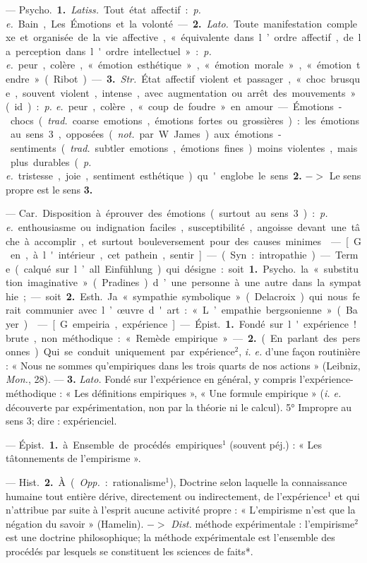 \begin{itemize}[leftmargin=1cm, label=, itemsep=1pt]
 — \si{Psycho.} {\bf 1.} {\it Latiss.} Tout
état affectif : {\it p. e.} Bain, Les Émotions
et la volonté. — {\bf 2.} {\it Lato.} Toute manifestation complexe et organisée
de la vie affective, « équivalente
dans l’ordre affectif, de la perception dans l'ordre intellectuel » :
{\it p. e.} peur, colère, « émotion esthétique », « émotion morale », « émotion tendre » (Ribot). — {\bf 3.} {\it Str.}
État affectif violent et passager,
« choc brusque, souvent violent,
intense, avec augmentation ou arrêt
des mouvements » (id.) : {\it p. e.} peur,
colère, « coup de foudre » en amour.
— Émotions-chocs ({\it trad.} coarse emotions, émotions fortes ou grossières) :
les émotions au sens 3, opposées
({\it not.} par W. James) aux émotions-sentiments ({\it trad.} subtler emotions,
émotions fines) moins violentes,
mais plus durables ({\it p. e.} tristesse,
joie, sentiment esthétique) qu'englobe le sens {\bf 2.} $->$ Le sens propre
est le sens {\bf 3.}

 — \si{Car.} Disposition à
éprouver des émotions (surtout au
sens 3) : {\it p. e.} enthousiasme ou indignation faciles, susceptibilité, angoisse devant une tâche à accomplir,
et surtout bouleversement pour des
causes minimes.

 — [G. en, à l'intérieur, cet
pathein, sentir] — (Syn. : intropathie).
— Terme (calqué sur l’all. Einfühlung) qui désigne : soit {\bf 1.} \si{Psycho.} la
« substitution imaginative » (Pradines) d’une personne à une autre
dans la sympathie; — soit {\bf 2.} \si{Esth.}
Ja « sympathie symbolique » (Delacroix) qui nous ferait communier
avec l’œuvre d'art : « L’empathie
bergsonienne » (Bayer).

 — [G. empeiria, expérience]
— \si{Épist.} {\bf 1.} Fondé sur l'expérience!
brute, non méthodique : « Remède
empirique ». — {\bf 2.} (En parlant des
personnes). Qui se conduit uniquement par expérience$^2$, {\it i. e.} d'une
façon routinière : « Nous ne sommes
qu’empiriques dans les trois quarts
de nos actions » (Leibniz, {\it Mon.}, 28).
— {\bf 3.} {\it Lato.} Fondé sur l'expérience
en général, y compris l’expérience-méthodique : « Les définitions empiriques », « Une formule empirique » ({\it i. e.} découverte par expérimentation, non par la théorie ni le
calcul). 5° Impropre au sens 3;
dire : expérienciel.

 — \si{Épist.} {\bf 1.} à Ensemble de
procédés empiriques$^1$ (souvent péj.) :
« Les tâtonnements de l’empirisme ».

— \si{Hist.} {\bf 2.} À ({\it Opp.}: rationalisme$^1$),
Doctrine selon laquelle la connaissance humaine tout entière dérive,
directement ou indirectement, de
l'expérience$^1$ et qui n’attribue par
suite à l'esprit aucune activité propre : « L’empirisme n’est que la
négation du savoir » (Hamelin).
$->$ {\it Dist.} méthode expérimentale :
l'empirisme$^2$ est une doctrine philosophique; la méthode expérimentale
est l'ensemble des procédés par
lesquels se constituent les sciences
de faits*.


\end{itemize}

